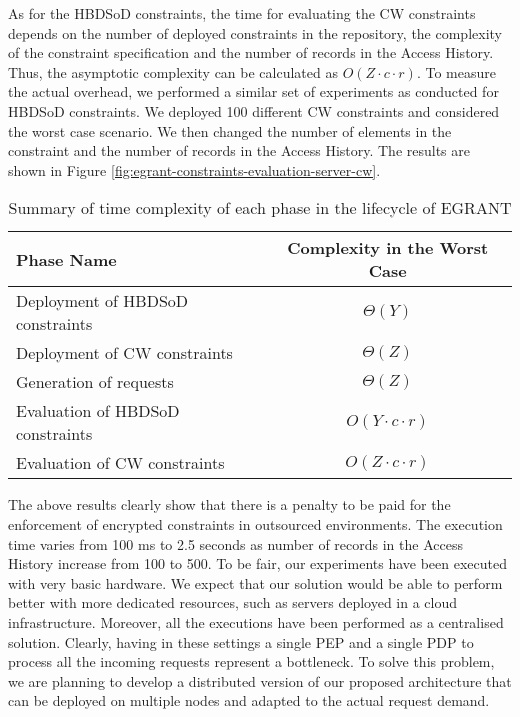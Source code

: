 \documentclass[epsfig,a4paper,11pt,titlepage]{book}
\numberwithin{algorithm}{chapter}
\begin{document}
As for the \gls{HBDSoD} constraints, the time for evaluating the \gls{CW} constraints depends on the number of deployed constraints in the repository, the complexity of the constraint specification and the number of records in the Access History. Thus, the asymptotic complexity can be calculated as $O(Z \cdot c \cdot r)$. To measure the actual overhead, we performed a similar set of experiments as conducted for \gls{HBDSoD} constraints. We deployed 100 different \gls{CW} constraints and considered the worst case scenario. We then changed the number of elements in the constraint and the number of records in the Access History. The results are shown in Figure \ref{fig:egrant-constraints-evaluation-server-cw}.


\begin{table} [htp]
\centering
\caption[Time complexity of each phase in the lifecycle of E-GRANT]{Summary of time complexity of each phase in the lifecycle of \gls{EGRANT}}
\label{tab:egrant-complexity-summary}

\begin{tabular}{ |l|c| } 

\hline

\textbf{Phase Name} & \textbf{Complexity in the Worst Case} \\ \hline

Deployment of \gls{HBDSoD} constraints & ${\Theta}( Y )$ \\ \hline

Deployment of \gls{CW} constraints & ${\Theta}( Z )$ \\ \hline

Generation of requests & ${\Theta}( Z )$ \\ \hline

Evaluation of \gls{HBDSoD} constraints & $O ( Y \cdot c \cdot r )$ \\ \hline

Evaluation of \gls{CW} constraints & $O ( Z \cdot c \cdot r )$ \\ \hline

\end{tabular}

\end{table}


The above results clearly show that there is a penalty to be paid for the enforcement of encrypted constraints in outsourced environments. The execution time varies from 100 \gls{ms} to 2.5 seconds as number of records in the Access History increase from 100 to 500. To be fair, our experiments have been executed with very basic hardware. We expect that our solution would be able to perform better with more dedicated resources, such as servers deployed in a cloud infrastructure. Moreover, all the executions have been performed as a centralised solution. Clearly, having in these settings a single \gls{PEP} and a single \gls{PDP} to process all the incoming requests represent a bottleneck. To solve this problem, we are planning to develop a distributed version of our proposed architecture that can be deployed on multiple nodes and adapted to the actual request demand.
\end{document}
